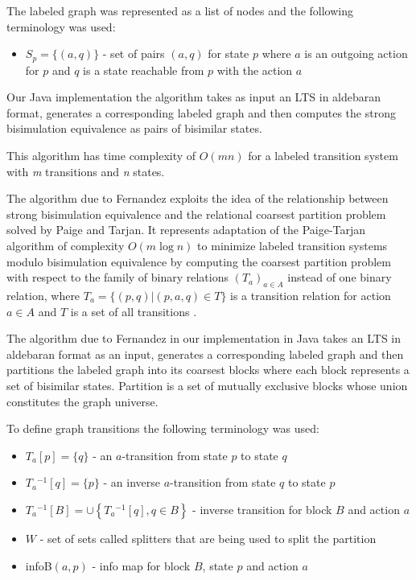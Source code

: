 The labeled graph was represented as a list of nodes and the following terminology was used:
\begin{itemize}
	\item $S_p=\{(a, q)\}$ - set of pairs $(a, q)$ for state $p$ where $a$ is an outgoing action for $p$ and $q$ is a state
	reachable from $p$ with the action $a$
\end{itemize}

Our Java implementation the algorithm takes as input an LTS in aldebaran format, generates a corresponding labeled 
graph and then computes the strong bisimulation equivalence as pairs of bisimilar states.

This algorithm has time complexity of $O(mn)$ for a labeled transition system with \emph{m} transitions and \emph{n} 
states. 

The algorithm due to Fernandez exploits the idea of the relationship between strong bisimulation equivalence 
and the relational coarsest partition problem solved by Paige and Tarjan. It represents adaptation of the 
Paige-Tarjan algorithm of complexity $O(m \log n)$ to minimize labeled transition systems modulo bisimulation 
equivalence by computing the coarsest partition problem with respect to the family of binary relations 
$\left(T_a\right)_{a\in A}$ instead of one binary relation, where $T_a=\{(p,q)|(p,a,q)\in T\}$ is a transition 
relation for action ${a\in A}$ and $T$ is a set of all transitions \cite{PaigeTarjan, Fernandez}.

The algorithm due to Fernandez in our implementation in Java takes an LTS in aldebaran format as an input, generates a 
corresponding labeled graph and then partitions the labeled graph into its coarsest blocks where each block represents 
a set of bisimilar states. Partition is a set of mutually exclusive blocks whose union constitutes the graph universe.

To define graph transitions the following terminology was used: 
\begin{itemize}
	\item $T_a[p]=\{q\}$ - an $a$-transition from state $p$ to state $q$
	\item $T_a{}^{-1}[q]=\{p\}$ - an inverse $a$-transition from state $q$ to state $p$
	\item $T_a{}^{-1}[B]=\cup \left\{T_a{}^{-1}[q],q\in B\right\}$ - inverse transition for block $B$ and action $a$
	\item $W$ - set of sets called splitters that are being used to split the partition
	\item infoB$(a, p)$ - info map for block $B$, state $p$ and action $a$
\end{itemize}

